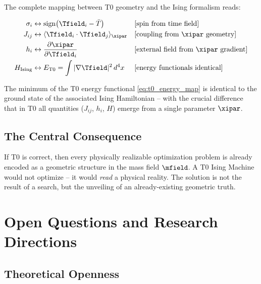 The complete mapping between T0 geometry and the Ising formalism reads:

\begin{align}
    \sigma_i &\leftrightarrow \operatorname{sign}\!\left(\Tfield_i - \bar{T}\right)
    &&\text{[spin from time field]}
    \label{eq:t0_spin_map}\\
    J_{ij} &\leftrightarrow \langle \Tfield_i \cdot \Tfield_j \rangle_{\xipar}
    &&\text{[coupling from $\xipar$ geometry]}
    \label{eq:t0_j_map}\\
    h_i &\leftrightarrow \frac{\partial \xipar}{\partial \Tfield_i}
    &&\text{[external field from $\xipar$ gradient]}
    \label{eq:t0_h_map}\\
    H_{\text{Ising}} &\leftrightarrow E_{\text{T0}} = \int |\nabla \Tfield|^2 \, d^4x
    &&\text{[energy functionals identical]}
    \label{eq:t0_energy_map}
\end{align}

The minimum of the T0 energy functional \eqref{eq:t0_energy_map} is identical to
the ground state of the associated Ising Hamiltonian -- with the crucial difference
that in T0 all quantities ($J_{ij}$, $h_i$, $H$) emerge from a single parameter
$\xipar$.

\subsection{The Central Consequence}

\begin{revolutionary}
    If T0 is correct, then every physically realizable optimization problem is already
    encoded as a geometric structure in the mass field $\mfield$. A T0 Ising Machine
    would not optimize -- it would \emph{read} a physical reality. The solution is not
    the result of a search, but the unveiling of an already-existing geometric truth.
\end{revolutionary}

\clearpage

\section{Open Questions and Research Directions}
\label{sec:questions}

\subsection{Theoretical Openness}

